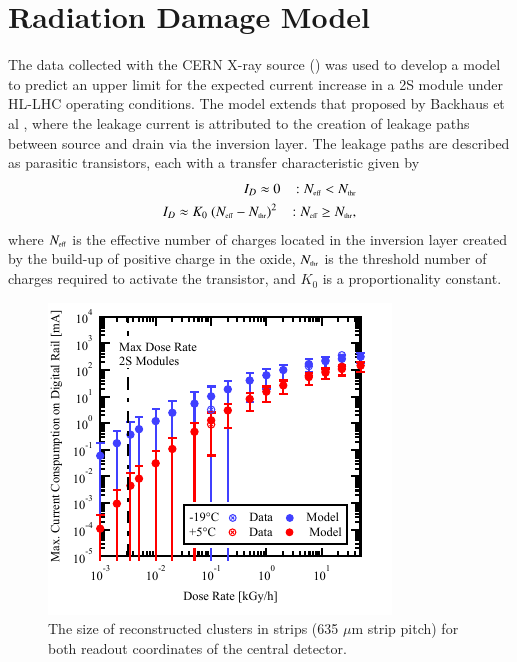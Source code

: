 \section{Radiation Damage Model}
The data collected with the CERN X-ray source  () was used to develop a model to predict an upper limit for the expected current increase in a 2S module under HL-LHC operating conditions. The model extends that proposed by Backhaus et al \cite{BackhausFeI4}, where the leakage current is attributed to the creation of leakage paths between source and drain via the inversion layer. The leakage paths are described as parasitic transistors, each with a transfer characteristic given by 
\begin{eqnarray}
I_D \approx 0 \,\,\,\,\,: N_{\mbox{\tiny{eff}}} < N_{\mbox{\tiny{thr}}} \\
I_D \approx K_0~(N_{\mbox{\tiny{eff}}} - N_{\mbox{\tiny{thr}}})^2 \,\,\,\,\,: N_{\mbox{\tiny{eff}}} \ge N_{\mbox{\tiny{thr}}} ,
\label{eq:TransferCharacteristic_ParasiticTransistors}
\end{eqnarray}
where $N_{\mbox{\tiny{eff}}}$ is the effective number of charges located in the inversion layer created by the build-up of positive charge in the oxide, $N_{\mbox{\tiny{thr}}}$ is the threshold number of charges required to activate the transistor, and ${K_0}$ is a proportionality constant.
\begin{figure}[htbp]
\centering
\includegraphics[width=0.8\linewidth]{Figures/ModelPrediction_CurrentConsumption.pdf}
\vspace*{-5mm}
\caption{The size of reconstructed clusters in strips (635 $\mu$m
strip pitch) for both readout coordinates of the central detector.}
\label{fig:ModelComparison_CurrentIncrease}
\end{figure}

